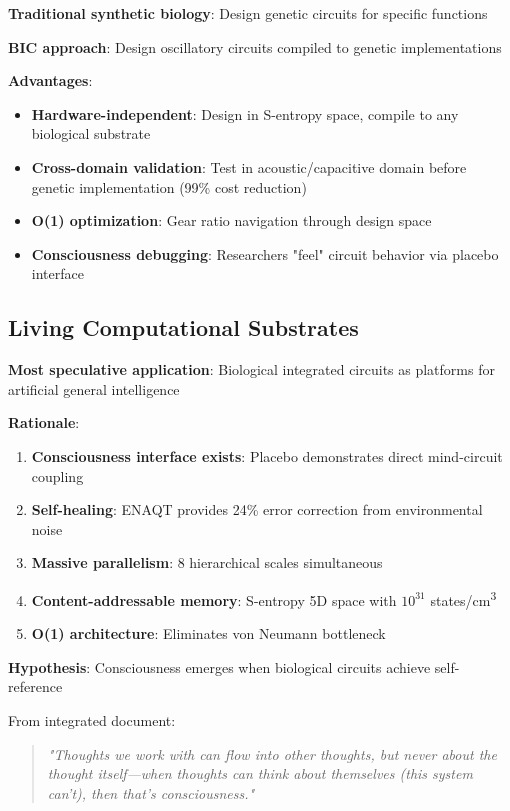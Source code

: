 \documentclass[11pt,a4paper]{article}
\begin{document}
\textbf{Traditional synthetic biology}: Design genetic circuits for specific functions

\textbf{BIC approach}: Design oscillatory circuits compiled to genetic implementations

\textbf{Advantages}:
\begin{itemize}
\item \textbf{Hardware-independent}: Design in S-entropy space, compile to any biological substrate
\item \textbf{Cross-domain validation}: Test in acoustic/capacitive domain before genetic implementation (99\% cost reduction)
\item \textbf{O(1) optimization}: Gear ratio navigation through design space
\item \textbf{Consciousness debugging}: Researchers "feel" circuit behavior via placebo interface
\end{itemize}

\subsection{Living Computational Substrates}

\textbf{Most speculative application}: Biological integrated circuits as platforms for artificial general intelligence

\textbf{Rationale}:
\begin{enumerate}
\item \textbf{Consciousness interface exists}: Placebo demonstrates direct mind-circuit coupling
\item \textbf{Self-healing}: ENAQT provides 24\% error correction from environmental noise
\item \textbf{Massive parallelism}: 8 hierarchical scales simultaneous
\item \textbf{Content-addressable memory}: S-entropy 5D space with $10^{31}$ states/cm\textsuperscript{3}
\item \textbf{O(1) architecture}: Eliminates von Neumann bottleneck
\end{enumerate}

\textbf{Hypothesis}: Consciousness emerges when biological circuits achieve self-reference

From integrated document:
\begin{quote}
\textit{"Thoughts we work with can flow into other thoughts, but never about the thought itself—when thoughts can think about themselves (this system can't), then that's consciousness."}
\end{quote}
\end{document}
